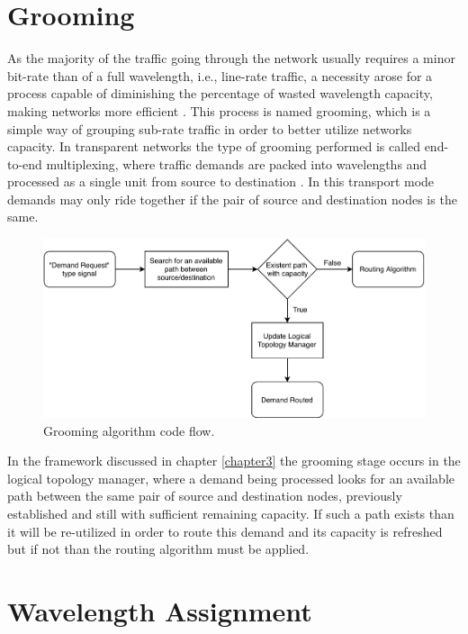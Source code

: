 \section{Grooming}
\label{G}

As the majority of the traffic going through the network usually requires a minor bit-rate than of a full wavelength, i.e., line-rate traffic, a necessity arose for a process capable of diminishing the percentage of wasted wavelength capacity, making networks more efficient \cite{SimmonsJane2008}. This process is named grooming, which is a simple way of grouping sub-rate traffic in order to better utilize networks capacity. In transparent networks the type of grooming performed is called end-to-end multiplexing, where traffic demands are packed into wavelengths and processed as a single unit from source to destination \cite{SimmonsJane2008}. In this transport mode demands may only ride together if the pair of source and destination nodes is the same.

\begin{figure}[H]
  \begin{center}
    \includegraphics[width=0.9 \textwidth]{fig/logos/groomingAlgorithm.pdf}
    \caption{Grooming algorithm code flow.}
  \end{center}
  \label{groomingAlgorithm}
\end{figure}
\clearpage
In the framework discussed in chapter \ref{chapter3} the grooming stage occurs in the logical topology manager, where a demand being processed looks for an available path between the same pair of source and destination nodes, previously established and still with sufficient remaining capacity. If such a path exists than it will be re-utilized in order to route this demand and its capacity is refreshed but if not than the routing algorithm must be applied.

\section{Wavelength Assignment}
\label{WA}

